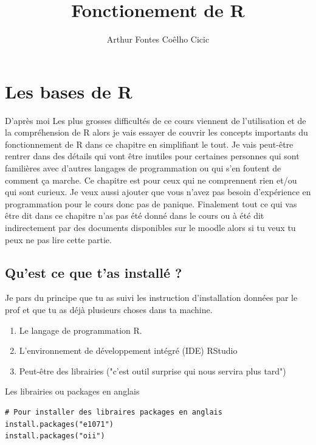 \documentclass{report}
\title{Fonctionement de R}
\author{Arthur Fontes Coêlho Cicic}
\begin{document}
\maketitle


\chapter{Les bases de R}

D'après moi Les plus grosses difficultés de ce cours viennent de l'utilisation et de la compréhension de R alors je vais essayer de couvrir les concepts importants du fonctionnement de R dans ce chapitre en simplifiant le tout. Je vais peut-être rentrer dans des détails qui vont être inutiles pour certaines personnes qui sont familières avec d'autres langages de programmation ou qui s'en foutent de comment ça marche. Ce chapitre est pour ceux qui ne comprennent rien et/ou qui sont curieux. Je veux aussi ajouter que vous n'avez pas besoin d'expérience en programmation pour le cours donc pas de panique. Finalement tout ce qui vas être dit dans ce chapitre n'as pas été donné dans le cours ou à été dit indirectement par des documents disponibles sur le moodle alors si tu veux tu peux ne pas lire cette partie.

\section{Qu'est ce que t'as installé ?}

Je pars du principe que tu as suivi les instruction d'installation données par le prof et que tu as déjà plusieurs choses dans ta machine.

\begin{enumerate}
    \item Le langage de programmation R.
    \item L'environnement de développement intégré (IDE) RStudio
    \item Peut-être des librairies ("c'est outil surprise qui nous servira plus tard")
\end{enumerate}

Les librairies ou packages en anglais 
\begin{lstlisting}[frame=single] 
# Pour installer des libraires packages en anglais
install.packages("e1071")
install.packages("oii")
\end{lstlisting}
\end{document}
